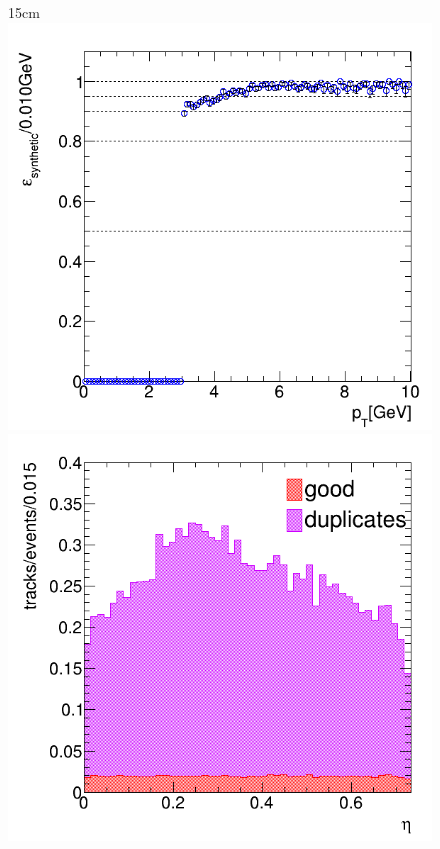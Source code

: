 \begin{figure}[htbp]{15cm}
	\includegraphics[scale=0.23]{AppendixCMSL1TT/figs/single_muon_nopu_tcat/am_tracks_reco_eff_vs_pt_allogics_nodupremoval}
	\includegraphics[scale=0.23]{AppendixCMSL1TT/figs/single_muon_nopu_tcat/am_tracks_categorization_vs_eta_allogics_nodupremoval}

\end{figure}
